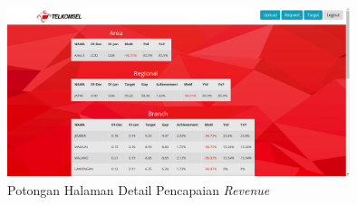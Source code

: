 \begin{figure}[h!]
	\centerline
	{\includegraphics[width=10cm,height=5cm]{bab5/tampilanDetailPencapaian.png}}
	\caption{Potongan Halaman Detail Pencapaian \textit{Revenue}}
	\label{figure:pencapaianTPORT}
\end{figure}


